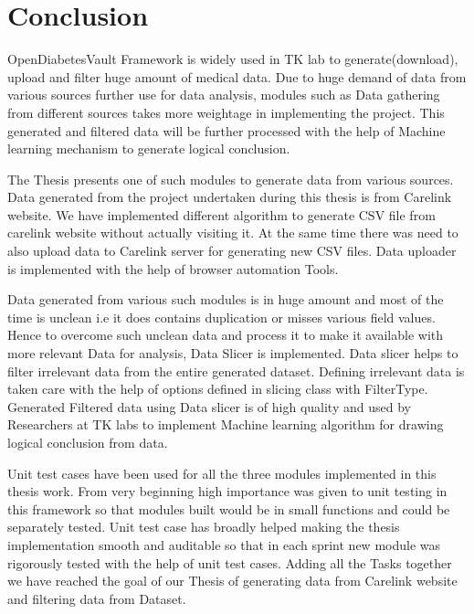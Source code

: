 \documentclass[article,type=msc,colorback,accentcolor=tud9c,twoside,11pt]{tudthesis}
\begin{document}
\clearpage
\section{Conclusion}
OpenDiabetesVault Framework is widely used in TK lab to generate(download), upload and filter huge amount of medical data. Due to huge demand of data from various sources further use for data analysis, modules such as Data gathering from different sources takes more weightage in implementing the project. This generated and filtered data will be further processed with the help of Machine learning mechanism to generate logical conclusion. 

The Thesis presents one of such modules to generate data from various sources. Data generated from the project undertaken during this thesis is from Carelink website. We have implemented different algorithm to generate CSV file from carelink website without actually visiting it. At the same time there was need to also upload data to Carelink server for generating new CSV files. Data uploader is implemented with the help of browser automation Tools.

Data generated from various such modules is in huge amount and most of the time is unclean i.e it does contains duplication or misses various field values. Hence to overcome such unclean data and process it to make it available with more relevant Data for analysis, Data Slicer is implemented. Data slicer helps to filter irrelevant data from the entire generated dataset. Defining irrelevant data is taken care with the help of options defined in slicing class with FilterType. Generated Filtered data using Data slicer is of high quality and used by Researchers at TK labs to implement Machine learning algorithm  for drawing logical conclusion from data.

Unit test cases have been used for all the three modules implemented in this thesis work. From very beginning high importance was given to unit testing in this framework so that modules built would be in small functions and could be separately tested. Unit test case has broadly helped making the thesis implementation smooth and auditable so that in each sprint new module was rigorously tested with the help of unit test cases. Adding all the Tasks together we have reached the goal of our Thesis of generating data from Carelink website and filtering data from Dataset.


\cleardoublepage
\cleardoublepage


\end{document}

